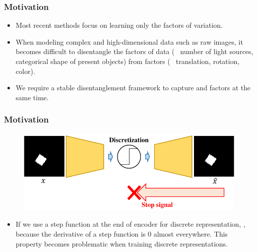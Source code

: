 \documentclass[10pt,mathserif]{beamer}
\begin{document}
\begin{frame}
\begin{figure}
%
\end{figure}
\end{frame}

\begin{frame}
\frametitle{Motivation}
\begin{itemize}\itemsep=20pt
\item Most recent methods focus on learning only the {\color{blue}{continuous}} factors of variation. \pause
\item When modeling complex and high-dimensional data such as raw images, it becomes difficult to disentangle the {\color{blue}{discrete}} factors of data (\ie~ number of light sources, categorical shape of present objects) from {\color{blue}{continuous}} factors (\ie~ translation, rotation, color).\pause
\item We require a stable disentanglement framework to capture {\color{blue}{continuous}} and {\color{blue}{discrete}} factors at the same time.
\end{itemize}
\end{frame}


\begin{frame}
\frametitle{Motivation}
\begin{figure}
\centering
\includegraphics[page=1, width=\linewidth]{dis_asset/discrete}%
\end{figure}
\begin{itemize}
    \item If we use a step function at the end of encoder for discrete representation, {\color{red}{back-propagation cannot provide the training signal}}, because the derivative of a step function is 0 almost everywhere. This property becomes problematic when training discrete representations. 
\end{itemize}
\end{frame}
\end{document}
